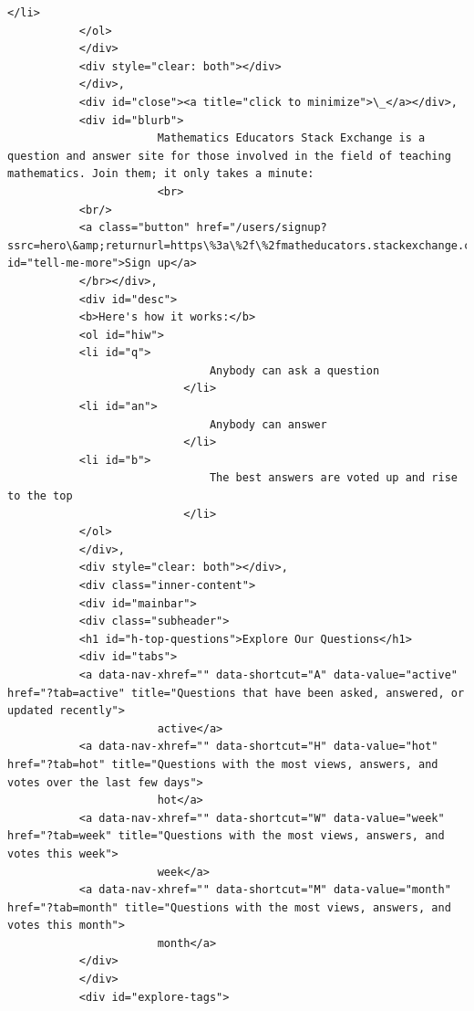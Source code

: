 \documentclass[11pt]{article}
\begin{document}
\begin{Verbatim}[commandchars=\\\{\}]
                           </li>
           </ol>
           </div>
           <div style="clear: both"></div>
           </div>,
           <div id="close"><a title="click to minimize">\_</a></div>,
           <div id="blurb">
                       Mathematics Educators Stack Exchange is a question and answer site for those involved in the field of teaching mathematics. Join them; it only takes a minute:
                       <br>
           <br/>
           <a class="button" href="/users/signup?ssrc=hero\&amp;returnurl=https\%3a\%2f\%2fmatheducators.stackexchange.com\%2f" id="tell-me-more">Sign up</a>
           </br></div>,
           <div id="desc">
           <b>Here's how it works:</b>
           <ol id="hiw">
           <li id="q">
                               Anybody can ask a question
                           </li>
           <li id="an">
                               Anybody can answer
                           </li>
           <li id="b">
                               The best answers are voted up and rise to the top
                           </li>
           </ol>
           </div>,
           <div style="clear: both"></div>,
           <div class="inner-content">
           <div id="mainbar">
           <div class="subheader">
           <h1 id="h-top-questions">Explore Our Questions</h1>
           <div id="tabs">
           <a data-nav-xhref="" data-shortcut="A" data-value="active" href="?tab=active" title="Questions that have been asked, answered, or updated recently">
                       active</a>
           <a data-nav-xhref="" data-shortcut="H" data-value="hot" href="?tab=hot" title="Questions with the most views, answers, and votes over the last few days">
                       hot</a>
           <a data-nav-xhref="" data-shortcut="W" data-value="week" href="?tab=week" title="Questions with the most views, answers, and votes this week">
                       week</a>
           <a data-nav-xhref="" data-shortcut="M" data-value="month" href="?tab=month" title="Questions with the most views, answers, and votes this month">
                       month</a>
           </div>
           </div>
           <div id="explore-tags">

\end{Verbatim}
\end{document}
